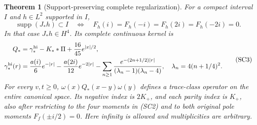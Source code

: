 \documentclass[11pt]{article}
\newtheorem{theorem}{Theorem}
\theoremstyle{remark}\newtheorem{remark}[theorem]{Remark}
\begin{document}
\begin{theorem}[Support-preserving complete regularization]
\label{thm:support-resolvent}
For a compact interval \(I\) and \(h\in L^2\) supported in \(I\),
\[
 \operatorname{supp}(J_*h)\subset I
 \quad\Longleftrightarrow\quad
 F_h(i)=F_h(-i)=F_h(2i)=F_h(-2i)=0.                  \tag{SC2}
\]
In that case \(J_*h\in H^4\). Its complete continuous kernel is
\[
 \begin{split}
 Q_*&=\gamma_*^{\rm hi}-K_* *\Pi+\frac{16}{45}e^{|x|/2},\\
 \gamma_*^{\rm hi}(r)
 &=\frac{a(i)}6e^{-|r|}-\frac{a(2i)}{12}e^{-2|r|}
   -\sum_{n\ge1}\frac{e^{-(2n+1/2)|r|}}
                         {(\lambda_n-1)(\lambda_n-4)},\quad
 \lambda_n=4(n+1/4)^2.
 \end{split}                                        \tag{SC3}
\]
For every \(v,t\ge0\), \(\omega(x)Q_*(x-y)\omega(y)\)
defines a trace-class operator on the entire canonical space.
Its negative index is \(2K_+\), and each parity index is \(K_+\),
also after restricting to the four moments in (SC2) and to both
original pole moments \(F_f(\pm i/2)=0\).
Here infinity is allowed and multiplicities are arbitrary.
\end{theorem}
\end{document}
